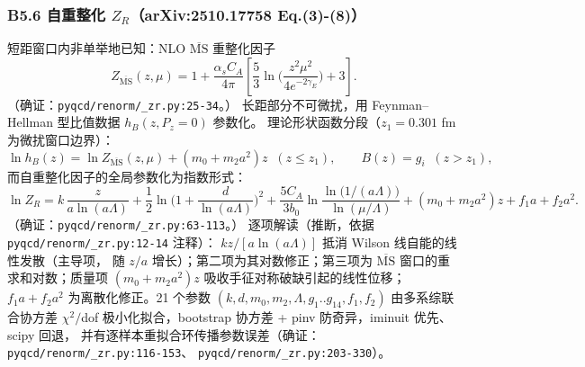 \documentclass[UTF8]{ctexart}
\begin{document}
\subsubsection{B5.6 自重整化 $Z_R$（arXiv:2510.17758 Eq.(3)-(8)）}
短距窗口内非单举地已知：NLO $\overline{\mathrm{MS}}$ 重整化因子
\begin{equation}
Z_{\overline{\mathrm{MS}}}(z,\mu)=1+\frac{\alpha_s C_A}{4\pi}
\left[\frac53\ln\!\Big(\frac{z^2\mu^2}{4e^{-2\gamma_E}}\Big)+3\right].
\label{eq:ZMS}
\end{equation}
（确证：\texttt{\nolinkurl{pyqcd/renorm/_zr.py:25-34}}。）
长距部分不可微扰，用 Feynman--Hellman 型比值数据 $h_B(z,P_z{=}0)$ 参数化。
理论形状函数分段（$z_1=0.301$ fm 为微扰窗口边界）：
\begin{equation}
\ln h_B(z)=\ln Z_{\overline{\mathrm{MS}}}(z,\mu)+(m_0+m_2a^2)z
\;\;(z\le z_1),\qquad
B(z)=g_i\;\;(z>z_1),
\label{eq:th_hB}
\end{equation}
而自重整化因子的全局参数化为指数形式：
\begin{equation}
\ln Z_R=k\,\frac{z}{a\ln(a\Lambda)}
+\frac12\ln\!\Big(1+\frac{d}{\ln(a\Lambda)}\Big)^{\!2}
+\frac{5C_A}{3b_0}\ln\!\frac{\ln\big(1/(a\Lambda)\big)}{\ln(\mu/\Lambda)}
+(m_0+m_2a^2)z+f_1a+f_2a^2.
\label{eq:ZR}
\end{equation}
（确证：\texttt{\nolinkurl{pyqcd/renorm/_zr.py:63-113}}。）
逐项解读（推断，依据 \texttt{\nolinkurl{pyqcd/renorm/_zr.py:12-14}} 注释）：
$k z/[a\ln(a\Lambda)]$ 抵消 Wilson 线自能的线性发散（主导项，
随 $z/a$ 增长）；第二项为其对数修正；第三项为 $\overline{\mathrm{MS}}$
窗口的重求和对数；质量项 $(m_0+m_2a^2)z$ 吸收手征对称破缺引起的线性位移；
$f_1a+f_2a^2$ 为离散化修正。21 个参数
$(k,d,m_0,m_2,\Lambda,g_1..g_{14},f_1,f_2)$ 由多系综联合协方差
$\chi^2/$dof 极小化拟合，bootstrap 协方差 + pinv 防奇异，iminuit 优先、scipy 回退，
并有逐样本重拟合环传播参数误差（确证：
\texttt{\nolinkurl{pyqcd/renorm/_zr.py:116-153}}、
\texttt{\nolinkurl{pyqcd/renorm/_zr.py:203-330}}）。
\end{document}
